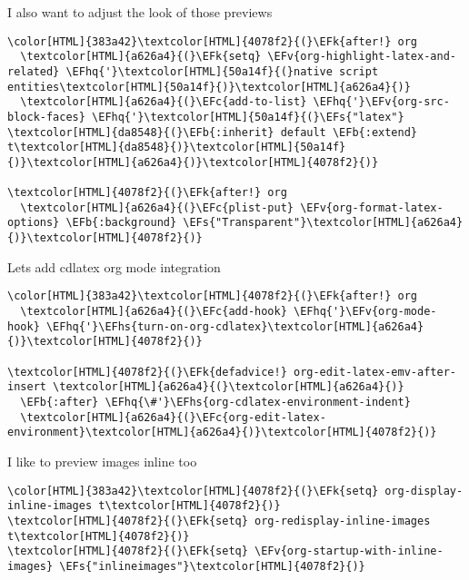 \documentclass{scrartcl}
\newcommand{\EFk}[1]{\textcolor{EFk}{#1}} %
\newcommand{\EFs}[1]{\textcolor{EFs}{#1}} %
\newcommand{\EFb}[1]{\textcolor{EFb}{#1}} %
\newcommand{\EFc}[1]{\textcolor{EFc}{#1}} %
\newcommand{\EFv}[1]{\textcolor{EFv}{#1}} %
\newcommand{\EFhq}[1]{\textcolor{EFhq}{#1}} %
\newcommand{\EFhs}[1]{\textcolor{EFhs}{#1}} %
\begin{document}
I also want to adjust the look of those previews
\begin{Code}
\begin{Verbatim}[]
\color[HTML]{383a42}\textcolor[HTML]{4078f2}{(}\EFk{after!} org
  \textcolor[HTML]{a626a4}{(}\EFk{setq} \EFv{org-highlight-latex-and-related} \EFhq{'}\textcolor[HTML]{50a14f}{(}native script entities\textcolor[HTML]{50a14f}{)}\textcolor[HTML]{a626a4}{)}
  \textcolor[HTML]{a626a4}{(}\EFc{add-to-list} \EFhq{'}\EFv{org-src-block-faces} \EFhq{'}\textcolor[HTML]{50a14f}{(}\EFs{"latex"} \textcolor[HTML]{da8548}{(}\EFb{:inherit} default \EFb{:extend} t\textcolor[HTML]{da8548}{)}\textcolor[HTML]{50a14f}{)}\textcolor[HTML]{a626a4}{)}\textcolor[HTML]{4078f2}{)}

\textcolor[HTML]{4078f2}{(}\EFk{after!} org
  \textcolor[HTML]{a626a4}{(}\EFc{plist-put} \EFv{org-format-latex-options} \EFb{:background} \EFs{"Transparent"}\textcolor[HTML]{a626a4}{)}\textcolor[HTML]{4078f2}{)}
\end{Verbatim}
\end{Code}

Lets add cdlatex org mode integration
\begin{Code}
\begin{Verbatim}[]
\color[HTML]{383a42}\textcolor[HTML]{4078f2}{(}\EFk{after!} org
  \textcolor[HTML]{a626a4}{(}\EFc{add-hook} \EFhq{'}\EFv{org-mode-hook} \EFhq{'}\EFhs{turn-on-org-cdlatex}\textcolor[HTML]{a626a4}{)}\textcolor[HTML]{4078f2}{)}

\textcolor[HTML]{4078f2}{(}\EFk{defadvice!} org-edit-latex-emv-after-insert \textcolor[HTML]{a626a4}{(}\textcolor[HTML]{a626a4}{)}
  \EFb{:after} \EFhq{\#'}\EFhs{org-cdlatex-environment-indent}
  \textcolor[HTML]{a626a4}{(}\EFc{org-edit-latex-environment}\textcolor[HTML]{a626a4}{)}\textcolor[HTML]{4078f2}{)}
\end{Verbatim}
\end{Code}

I like to preview images inline too
\begin{Code}
\begin{Verbatim}[]
\color[HTML]{383a42}\textcolor[HTML]{4078f2}{(}\EFk{setq} org-display-inline-images t\textcolor[HTML]{4078f2}{)}
\textcolor[HTML]{4078f2}{(}\EFk{setq} org-redisplay-inline-images t\textcolor[HTML]{4078f2}{)}
\textcolor[HTML]{4078f2}{(}\EFk{setq} \EFv{org-startup-with-inline-images} \EFs{"inlineimages"}\textcolor[HTML]{4078f2}{)}
\end{Verbatim}
\end{Code}
\end{document}
